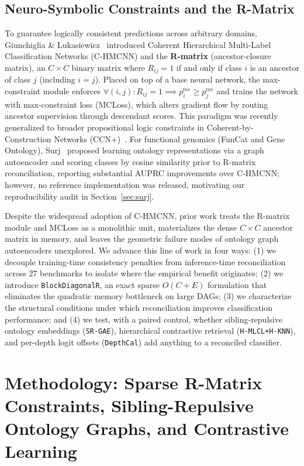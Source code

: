 \documentclass[preprint,12pt]{elsarticle}
\begin{document}
\subsection{Neuro-Symbolic Constraints and the R-Matrix}

To guarantee logically consistent predictions across arbitrary domains,
Giunchiglia \& Lukasiewicz~\cite{chmcnn} introduced Coherent Hierarchical
Multi-Label Classification Networks (C-HMCNN) and the \textbf{R-matrix}
(ancestor-closure matrix), an $C \times C$ binary matrix where $R_{ij} = 1$ if
and only if class $i$ is an ancestor of class $j$ (including $i=j$). Placed on
top of a base neural network, the max-constraint module enforces
$\forall (i,j): R_{ij}=1 \implies p_i^{\text{rec}} \geq p_j^{\text{rec}}$ and
trains the network with max-constraint loss (MCLoss), which alters gradient
flow by routing ancestor supervision through descendant scores. This paradigm
was recently generalized to broader propositional logic constraints in
Coherent-by-Construction Networks (CCN+)~\cite{giunchiglia2024ccn}. For functional
genomics (FunCat and Gene Ontology), Surj~\cite{www2022ontology} proposed
learning ontology representations via a graph autoencoder and scoring classes
by cosine similarity prior to R-matrix reconciliation, reporting substantial
AUPRC improvements over C-HMCNN; however, no reference implementation was
released, motivating our reproducibility audit in Section~\ref{sec:surj}.

Despite the widespread adoption of C-HMCNN, prior work treats the R-matrix
module and MCLoss as a monolithic unit, materializes the dense $C \times C$
ancestor matrix in memory, and leaves the geometric failure modes of ontology
graph autoencoders unexplored. We advance this line of work in four ways:
(1) we decouple training-time consistency penalties from inference-time
reconciliation across 27 benchmarks to isolate where the empirical benefit
originates; (2) we introduce \texttt{BlockDiagonalR}, an exact sparse
$O(C{+}E)$ formulation that eliminates the quadratic memory bottleneck on
large DAGs; (3) we characterize the structural conditions under which
reconciliation improves classification performance; and (4) we test, with a
paired control, whether sibling-repulsive ontology embeddings
(\texttt{SR-GAE}), hierarchical contrastive retrieval
(\texttt{H-MLCL+H-KNN}), and per-depth logit offsets (\texttt{DepthCal})
add anything to a reconciled classifier.

\section{Methodology: Sparse R-Matrix Constraints, Sibling-Repulsive Ontology Graphs, and Contrastive Learning}
\end{document}
